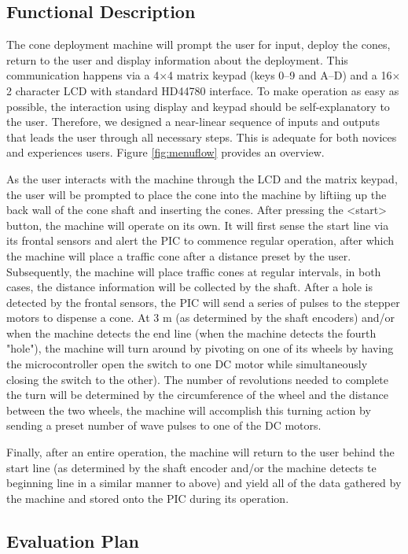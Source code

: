 \documentclass[11pt]{report}
\begin{document}
\subsection{Functional Description}
The cone deployment machine will prompt the user for input, deploy the cones, return to the user and display information about the deployment. This communication happens via a 4$\times$4 matrix keypad (keys 0--9 and A--D) and a 16$\times$2 character LCD with standard HD44780 interface. To make operation as easy as possible, the interaction using display and keypad should be self-explanatory to the user. Therefore, we designed a near-linear sequence of inputs and outputs that leads the user through all necessary steps. This is adequate for both novices and experiences users. Figure \ref{fig:menuflow} provides an overview.
 
As the user interacts with the machine through the LCD and the matrix keypad, the user will be prompted to place the cone into the machine by liftiing up the back wall of the cone shaft and inserting the cones. After pressing the <start> button, the machine will operate on its own. It will first sense the start line via its frontal sensors and alert the PIC to commence regular operation, after which the machine will place a traffic cone after a distance preset by the user. Subsequently, the machine will place traffic cones at regular intervals, in both cases, the distance information will be collected by the shaft. After a hole is detected by the frontal sensors, the PIC will send a series of pulses to the stepper motors to dispense a cone. At 3 m (as determined by the shaft encoders) and/or when the machine detects the end line (when the machine detects the fourth "hole"), the machine will turn around by pivoting on one of its wheels by having the microcontroller open the switch to one DC motor while simultaneously closing the switch to the other). The number of revolutions needed to complete the turn will be determined by the circumference of the wheel and the distance between the two wheels, the machine will accomplish this turning action by sending a preset number of wave pulses to one of the DC motors.
 
Finally, after an entire operation, the machine will return to the user behind the start line (as determined by the shaft encoder and/or the machine detects te beginning line in a similar manner to above) and yield all of the data gathered by the machine and stored onto the PIC during its operation.


\subsection{Evaluation Plan}
\end{document}
